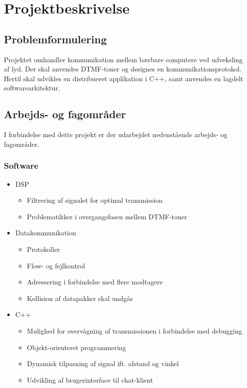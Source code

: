 \section{Projektbeskrivelse}

\subsection{Problemformulering}

Projektet omhandler kommunikation mellem bærbare computere ved udveksling af lyd. Der skal anvendes DTMF-toner og designes en kommunikationsprotokol. Hertil skal udvikles en distribueret applikation i C++, samt anvendes en lagdelt softwarearkitektur.

\subsection{Arbejds- og fagområder}

I forbindelse med dette projekt er der udarbejdet nedenstående arbejds- og fagområder.

\subsubsection{Software}

\begin{itemize}[noitemsep]
  \item DSP
  \begin{itemize}[noitemsep]
    \item Filtrering af signalet for optimal transmission
    \item Problematikker i overgangsfasen mellem DTMF-toner
  \end{itemize}
  \item Datakommunikation
  \begin{itemize}[noitemsep]
    \item Protokoller
    \item Flow- og fejlkontrol
    \item Adressering i forbindelse med flere modtagere
    \item Kollision af datapakker skal undgås
  \end{itemize}
  \item C++
    \begin{itemize}[noitemsep]
    \item Mulighed for overvågning af transmissionen i forbindelse med debugging
    \item Objekt-orienteret programmering
    \item Dynamisk tilpasning af signal ift. afstand og vinkel
    \item Udvikling af brugerinterface til chat-klient
  \end{itemize}
\end{itemize}


